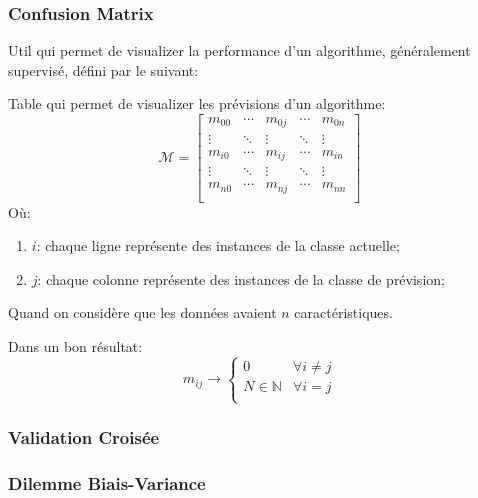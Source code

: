 \documentclass{article}
\begin{document}
\subsubsection{Confusion Matrix}
Util qui permet de visualizer la performance d'un algorithme, généralement supervisé, défini par le suivant:
\begin{definition}
    Table qui permet de visualizer les prévisions d'un algorithme:
    \begin{equation}
        \boxed{
            \mathcal{M} = 
            \begin{bmatrix}
                m_{00} & \cdots & m_{0j} & \cdots & m_{0n}\\
                \vdots & \ddots & \vdots & \ddots & \vdots\\
                m_{i0} & \cdots & m_{ij} & \cdots & m_{in}\\ 
                \vdots & \ddots & \vdots & \ddots & \vdots\\
                m_{n0} & \cdots & m_{nj} & \cdots & m_{nn}\\ 
            \end{bmatrix}
        }
    \end{equation}
    Où:
    \begin{enumerate}[noitemsep]
        \item $i$: chaque ligne représente des instances de la classe actuelle;
        \item $j$: chaque colonne représente des instances de la classe de prévision;
    \end{enumerate}
    Quand on considère que les données avaient $n$ caractéristiques.
    \begin{remark}
        Dans un bon résultat:
        \begin{equation*}
            m_{ij} \to 
            \begin{cases}
                0 & \forall i\neq j\\
                N\in\mathbb{N} & \forall i= j\\
            \end{cases}
        \end{equation*}
    \end{remark}
\end{definition}

\subsubsection{Validation Croisée}
\subsubsection{Dilemme Biais-Variance}
\end{document}
